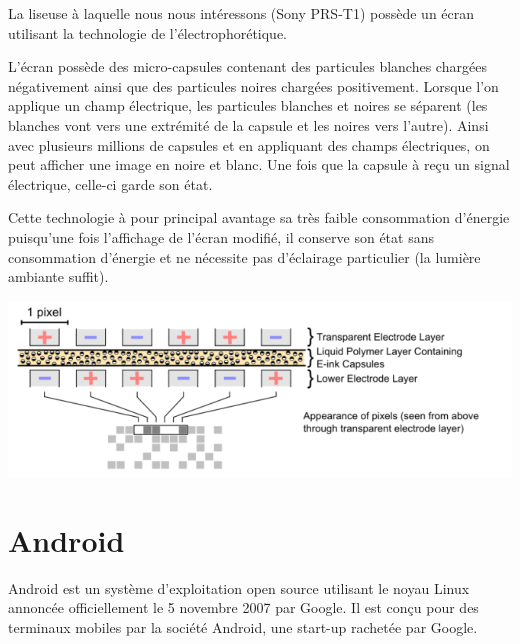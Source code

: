 La liseuse à laquelle nous nous intéressons (Sony PRS-T1) possède un écran utilisant la technologie de l'électrophorétique.

L'écran possède des micro-capsules contenant des particules blanches chargées négativement ainsi que des particules noires chargées positivement. Lorsque l'on applique un champ électrique, les particules blanches et noires se séparent (les blanches vont vers une extrémité de la capsule et les noires vers l'autre). Ainsi avec plusieurs millions de capsules et en appliquant des champs électriques, on peut afficher une image en noire et blanc. Une fois que la capsule à reçu un signal électrique, celle-ci garde son état.

Cette technologie à pour principal avantage sa très faible consommation d'énergie puisqu'une fois l'affichage de l'écran modifié, il conserve son état sans consommation d'énergie et ne nécessite pas d'éclairage particulier (la lumière ambiante suffit).

\begin{center}
	\includegraphics{Electrophoretic.png}
\end{center}


\section{Android}
Android est un système d'exploitation open source utilisant le noyau Linux annoncée officiellement le 5 novembre 2007 par Google. Il est conçu pour des terminaux mobiles par la société Android, une start-up rachetée par Google.

